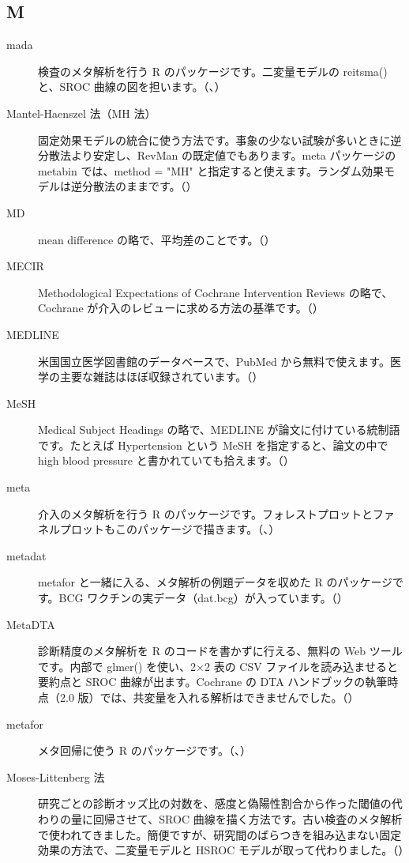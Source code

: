 \subsection*{M}
\begin{description}
\item[mada] 検査のメタ解析を行う R のパッケージです。二変量モデルの reitsma() と、SROC 曲線の図を担います。（、）
\item[Mantel-Haenszel 法（MH 法）] 固定効果モデルの統合に使う方法です。事象の少ない試験が多いときに逆分散法より安定し、RevMan の既定値でもあります。meta パッケージの metabin では、method = "MH" と指定すると使えます。ランダム効果モデルは逆分散法のままです。（）
\item[MD] mean difference の略で、平均差のことです。（）
\item[MECIR] Methodological Expectations of Cochrane Intervention Reviews の略で、Cochrane が介入のレビューに求める方法の基準です。（）
\item[MEDLINE] 米国国立医学図書館のデータベースで、PubMed から無料で使えます。医学の主要な雑誌はほぼ収録されています。（）
\item[MeSH] Medical Subject Headings の略で、MEDLINE が論文に付けている統制語です。たとえば Hypertension という MeSH を指定すると、論文の中で high blood pressure と書かれていても拾えます。（）
\item[meta] 介入のメタ解析を行う R のパッケージです。フォレストプロットとファネルプロットもこのパッケージで描きます。（、）
\item[metadat] metafor と一緒に入る、メタ解析の例題データを収めた R のパッケージです。BCG ワクチンの実データ（dat.bcg）が入っています。（）
\item[MetaDTA] 診断精度のメタ解析を R のコードを書かずに行える、無料の Web ツールです。内部で glmer() を使い、2×2 表の CSV ファイルを読み込ませると要約点と SROC 曲線が出ます。Cochrane の DTA ハンドブックの執筆時点（2.0 版）では、共変量を入れる解析はできませんでした。（）
\item[metafor] メタ回帰に使う R のパッケージです。（、）
\item[Moses-Littenberg 法] 研究ごとの診断オッズ比の対数を、感度と偽陽性割合から作った閾値の代わりの量に回帰させて、SROC 曲線を描く方法です。古い検査のメタ解析で使われてきました。簡便ですが、研究間のばらつきを組み込まない固定効果の方法で、二変量モデルと HSROC モデルが取って代わりました。（）
\end{description}

